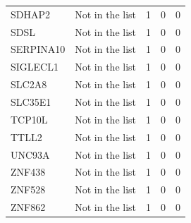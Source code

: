 \documentclass[12pt,twoside]{reedthesis}
\theoremstyle{definition}
\theoremstyle{definition}
\theoremstyle{remark}
\begin{document}
\begin{longtable}[t]{llrrr}
  \addlinespace
  SDHAP2 & Not in the list & 1 & 0 & 0\\
  SDSL & Not in the list & 1 & 0 & 0\\
  SERPINA10 & Not in the list & 1 & 0 & 0\\
  SIGLECL1 & Not in the list & 1 & 0 & 0\\
  SLC2A8 & Not in the list & 1 & 0 & 0\\
  \addlinespace
  SLC35E1 & Not in the list & 1 & 0 & 0\\
  TCP10L & Not in the list & 1 & 0 & 0\\
  TTLL2 & Not in the list & 1 & 0 & 0\\
  UNC93A & Not in the list & 1 & 0 & 0\\
  ZNF438 & Not in the list & 1 & 0 & 0\\
  \addlinespace
  ZNF528 & Not in the list & 1 & 0 & 0\\
  ZNF862 & Not in the list & 1 & 0 & 0\\
  \bottomrule
  \end{longtable}
  
  \newpage
  
\end{document}

